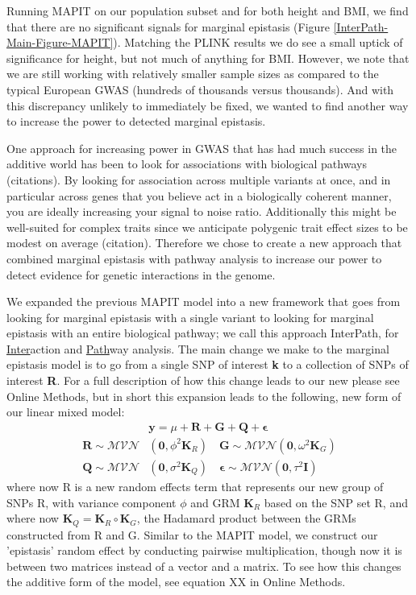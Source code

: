 \documentclass[12pt,a4paper]{article}
\begin{document}
Running MAPIT on our population subset and for both height and BMI, we find that there are no significant signals for marginal epistasis (Figure \ref{InterPath-Main-Figure-MAPIT}). Matching the PLINK results we do see a small uptick of significance for height, but not much of anything for BMI. However, we note that we are still working with relatively smaller sample sizes as compared to the typical European GWAS (hundreds of thousands versus thousands). And with this discrepancy unlikely to immediately be fixed, we wanted to find another way to increase the power to detected marginal epistasis. 


One approach for increasing power in GWAS that has had much success in the additive world has been to look for associations with biological pathways (citations). By looking for association across multiple variants at once, and in particular across genes that you believe act in a biologically coherent manner, you are ideally increasing your signal to noise ratio. Additionally this might be well-suited for complex traits since we anticipate polygenic trait effect sizes to be modest on average (citation). Therefore we chose to create a new approach that combined marginal epistasis with pathway analysis to increase our power to detect evidence for genetic interactions in the genome.  






We expanded the previous MAPIT model into a new framework that goes from looking for marginal epistasis with a single variant to looking for marginal epistasis with an entire biological pathway; we call this approach InterPath, for \underline{Inter}action and \underline{Path}way analysis. The main change we make to the marginal epistasis model is to go from a single SNP of interest \textbf{k} to a collection of SNPs of interest \textbf{R}. For a full description of how this change leads to our new please see Online Methods, but in short this expansion leads to the following, new form of our linear mixed model:
\begin{align}
    & \textbf{y} = \mu + \textbf{R} + \textbf{G} + \textbf{Q} + \boldsymbol{\epsilon} \\
    \textbf{R} \sim \mathcal{MVN}&(\textbf{0}, \phi^{2}\textbf{K}_R) \quad \textbf{G} \sim \mathcal{MVN}(\textbf{0}, \omega^{2}\textbf{K}_G) \nonumber \\ 
    \textbf{Q} \sim \mathcal{MVN}&(\textbf{0}, \sigma^{2}\textbf{K}_Q) \quad \boldsymbol{\epsilon} \sim \mathcal{MVN}(\textbf{0}, \tau^{2}\textbf{I}) \nonumber 
\end{align}
where now R is a new random effects term that represents our new group of SNPs R, with variance component $\phi$ and GRM $\textbf{K}_R$ based on the SNP set R, and where now $\textbf{K}_Q = \textbf{K}_R \circ \textbf{K}_G$, the Hadamard product between the GRMs constructed from R and G. Similar to the MAPIT model, we construct our 'epistasis' random effect by conducting pairwise multiplication, though now it is between two matrices instead of a vector and a matrix. To see how this changes the additive form of the model, see equation XX in Online Methods. 
\end{document}
